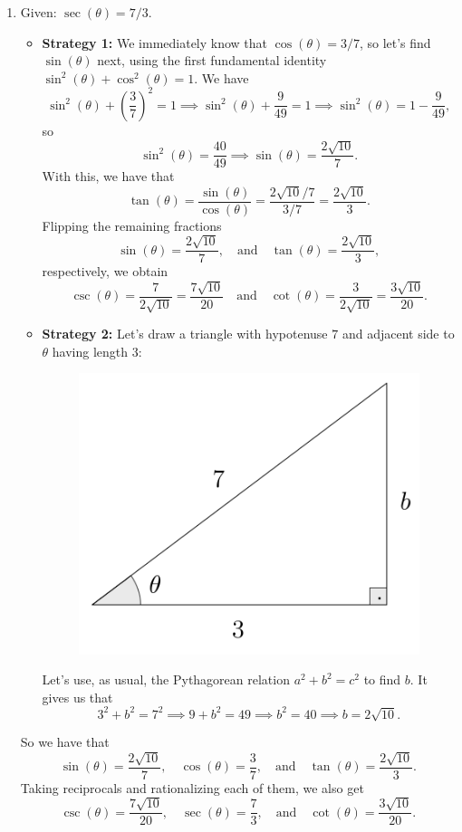 \documentclass{ximera}
\begin{document}
\begin{example}
\begin{enumerate}[label=\alph*.]
  \item Given: $\sec(\theta) = 7/3$.

    \begin{explanation}
      \begin{itemize}
      \item {\bf Strategy 1:} We immediately know that $\cos(\theta) = 3/7$, so let's find $\sin(\theta)$ next, using the first fundamental identity $\sin^2(\theta)+\cos^2(\theta)=1$. We have $$\sin^2(\theta) +\left(\frac{3}{7}\right)^2=1 \implies \sin^2(\theta)+\frac{9}{49}=1 \implies \sin^2(\theta) = 1-\frac{9}{49},$$so $$\sin^2(\theta) = \frac{40}{49} \implies \sin(\theta) = \frac{2\sqrt{10}}{7}.$$ With this, we have that \[   \tan(\theta) = \frac{\sin(\theta)}{\cos(\theta)} = \frac{2\sqrt{10}/7}{3/7} = \frac{2\sqrt{10}}{3}.  \]Flipping the remaining fractions $$\sin(\theta) = \frac{2\sqrt{10}}{7}, \quad\mbox{and}\quad \tan(\theta) = \frac{2\sqrt{10}}{3},$$respectively, we obtain $$\csc(\theta) = \frac{7}{2\sqrt{10}}  =\frac{7\sqrt{10}}{20}\quad\mbox{and}\quad \cot(\theta) = \frac{3}{2\sqrt{10}}=\frac{3\sqrt{10}}{20}.$$
      \item {\bf Strategy 2:} Let's draw a triangle with hypotenuse $7$ and adjacent side to $\theta$ having length $3$: \begin{figure}[h]
          \centering
          \includegraphics[scale=.3]{./figures/9-1-3-triangle-sec-7-3.png}
        \end{figure}Let's use, as usual, the Pythagorean relation $a^2+b^2=c^2$ to find $b$. It gives us that $$3^2+b^2=7^2\implies 9+b^2=49\implies b^2 = 40\implies b=2\sqrt{10}.$$ 
      \end{itemize}So we have that $$\sin(\theta)=\frac{2\sqrt{10}}{7},\quad\cos(\theta)=\frac{3}{7},\quad\mbox{and}\quad \tan(\theta)=\frac{2\sqrt{10}}{3}.$$Taking reciprocals and rationalizing each of them, we also get$$\csc(\theta)=\frac{7\sqrt{10}}{20},\quad\sec(\theta)=\frac{7}{3},\quad\mbox{and}\quad \cot(\theta)=\frac{3\sqrt{10}}{20}.$$
    \end{explanation}
    

\end{enumerate}
\end{example}
\end{document}
